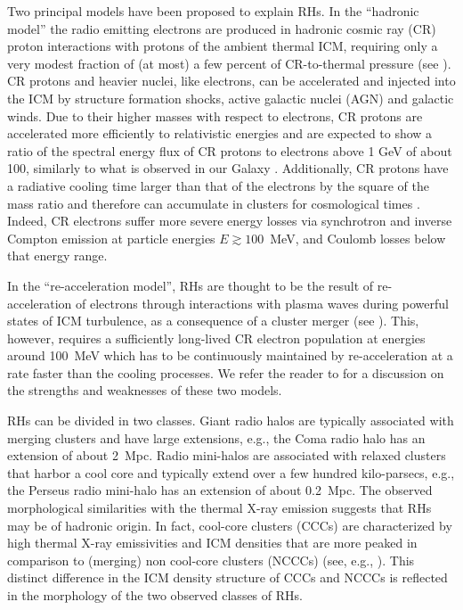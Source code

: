 \documentclass[traditabstract]{aa}
\begin{document}
Two principal models have been proposed to explain RHs.  In the ``hadronic
model'' the radio emitting electrons are produced in hadronic cosmic ray (CR)
proton interactions with protons of the ambient thermal ICM, requiring only a
very modest fraction of (at most) a few percent of CR-to-thermal pressure (see
\citealp{1980ApJ...239L..93D,1982AJ.....87.1266V, 1999APh....12..169B,
  2000A&A...362..151D, 2001ApJ...559...59M, 2001ApJ...562..233M,
  2003A&A...407L..73P, 2004A&A...413...17P, 2004MNRAS.352...76P,
  2007IJMPA..22..681B, 2008MNRAS.385.1211P, 2008MNRAS.385.1242P,
  2009JCAP...09..024K, 2010MNRAS.401...47D, 2010arXiv1003.0336D,
  2010arXiv1003.1133K, 2010arXiv1011.0729K, 2011A&A...527A..99E}).  CR protons
and heavier nuclei, like electrons, can be accelerated and injected into the ICM
by structure formation shocks, active galactic nuclei (AGN) and galactic winds.
Due to their higher masses with respect to electrons, CR protons are accelerated
more efficiently to relativistic energies and are expected to show a ratio of
the spectral energy flux of CR protons to electrons above 1 GeV of about 100,
similarly to what is observed in our Galaxy
\citep{2002cra..book.....S}. Additionally, CR protons have a radiative cooling
time larger than that of the electrons by the square of the mass ratio and
therefore can accumulate in clusters for cosmological times
\citep{1996SSRv...75..279V}. Indeed, CR electrons suffer more severe energy
losses via synchrotron and inverse Compton emission at particle energies $E
\gtrsim 100$~MeV, and Coulomb losses below that energy range.  

In the ``re-acceleration model'', RHs are thought to be the result of
re-acceleration of electrons through interactions with plasma waves during
powerful states of ICM turbulence, as a consequence of a cluster merger (see
\citealp{1987A&A...182...21S, 1993ApJ...406..399G, 2002A&A...386..456G,
  2004MNRAS.350.1174B, 2005MNRAS.363.1173B, 2007MNRAS.378..245B,
  2010arXiv1008.0184B, 2009A&A...507..661B}). This, however, requires a
sufficiently long-lived CR electron population at energies around 100~MeV which
has to be continuously maintained by re-acceleration at a rate faster than the
cooling processes.  We refer the reader to \citet{2011A&A...527A..99E} for a
discussion on the strengths and weaknesses of these two models.

RHs can be divided in two classes. Giant radio halos are typically associated
with merging clusters and have large extensions, e.g., the Coma radio halo has an
extension of about 2~Mpc. Radio mini-halos are associated with relaxed clusters
that harbor a cool core and typically extend over a few hundred kilo-parsecs,
e.g., the Perseus radio mini-halo has an extension of about 0.2~Mpc.  The
observed morphological similarities with the thermal X-ray emission suggests
that RHs may be of hadronic origin. In fact, cool-core clusters (CCCs) are
characterized by high thermal X-ray emissivities and ICM densities that are more
peaked in comparison to (merging) non cool-core clusters (NCCCs) (see,
e.g., \citealp{2008A&A...487..431C}). This distinct difference in the ICM density
structure of CCCs and NCCCs is reflected in the morphology of the two observed
classes of RHs.
\end{document}
